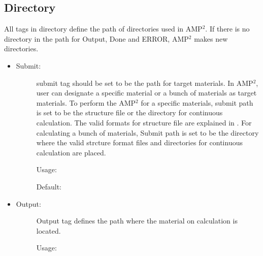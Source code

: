 \documentclass[letterpaper,10pt,english]{sphinxmanual}
\begin{document}
\subsection{Directory}
\label{\detokenize{Input/Configuration:directory}}
All tags in directory define the path of directories used in AMP$^{\text{2}}$.
If there is no directory in the path for Output, Done and ERROR, AMP$^{\text{2}}$ makes new directories.
\begin{itemize}
\item {} \begin{description}
\item[{Submit:}] \leavevmode
submit tag should be set to be the path for target materials. In AMP$^{\text{2}}$, user
can designate a specific material or a bunch of materials as target materials.
To perform the AMP$^{\text{2}}$ for a specific materials, submit path is set to be the structure
file or the directory for continuous calculation. The valid formats for structure file are
explained in .
For calculating a bunch of materials, Submit path is set to be the directory where the valid strcture
format files and directories for continuous calculation are placed.

Usage:

\begin{sphinxVerbatim}[commandchars=\\\{\}]
   \PYG{p}{[}   \PYG{p}{]}  \PYG{p}{[}  \PYG{p}{]}
\end{sphinxVerbatim}

Default:

\begin{sphinxVerbatim}[commandchars=\\\{\}]
   
\end{sphinxVerbatim}

\end{description}

\item {} \begin{description}
\item[{Output:}] \leavevmode
Output tag defines the path where the material on calculation is located.

Usage:

\begin{sphinxVerbatim}[commandchars=\\\{\}]
   \PYG{p}{[}  \PYG{p}{]}
\end{sphinxVerbatim}


\end{description}
\end{itemize}
\end{document}
